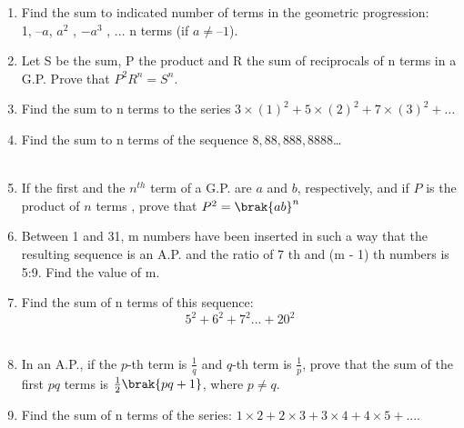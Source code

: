 \begin{enumerate}[label=\thesection.\arabic*,ref=\thesection.\theenumi]
\item Find the sum to indicated number of terms in the geometric progression:\\
1, $– a$, $a^2$
, $-a^3$
, ... n terms (if $a \neq – 1$).\\
\solution
\pagebreak

\item Let S be the sum, P the product and R the sum of reciprocals of n terms in a G.P.
Prove that $P^2 R^n = S^n$.\\
\solution
\pagebreak
\item Find the sum to n terms to the series $3\times(1)^2+5\times(2)^2+7\times(3)^2+ \ldots$\\
\solution
\pagebreak
\item Find the sum to n terms of the sequence $8,88,888,8888$\ldots\\
\solution\\

\pagebreak

\item If the first and the  $n^{th}$  term of a G.P. are $a$ and $b$, respectively, and if $P$ is the product of $n$ terms , prove that $ P^2 = \brak{ab}^n $ \\
\solution

\pagebreak

\item Between 1 and 31, m numbers have been inserted in such a way that the resulting sequence is an A.P. and 
the ratio of 7 th and (m - 1) th numbers is 5:9. Find the value of m.\\
\solution

\pagebreak
\item Find the sum of n terms of this sequence:$$5^2+6^2+7^2...+20^2$$  \\
\solution
\pagebreak

\item In an A.P., if the $p$-th term is $\frac{1}{q}$ and $q$-th term is $\frac{1}{p}$, prove that the sum of the first $pq$ terms is $\frac{1}{2}\brak{pq + 1}$, where $p \neq q$.\\
\solution

\pagebreak
\item Find the sum of n terms of the series:
$1\times2+2\times3+3\times4+4\times5+....$\\
\solution

\pagebreak

\end{enumerate}
